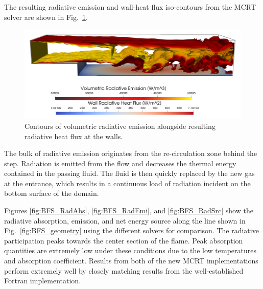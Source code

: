The resulting radiative emission and wall-heat flux iso-contours from the MCRT solver are shown in Fig.~\ref{fig:BFS_radiationcontours}.
\begin{figure}
\includegraphics[width=\linewidth]{figures/ch4/BFS_volwallflux3.png}
\caption{Contours of volumetric radiative emission alongside resulting radiative heat flux at the walls.}
\label{fig:BFS_radiationcontours}
\end{figure}
The bulk of radiative emission originates from the re-circulation zone behind the step. Radiation is emitted from the flow and decreases the thermal energy contained in the passing fluid. 
The fluid is then quickly replaced by the new gas at the entrance, which results in a continuous load of radiation incident on the bottom surface of the domain. 

Figures \ref{fig:BFS_RadAbs}, \ref{fig:BFS_RadEmi}, and \ref{fig:BFS_RadSrc} show the radiative absorption, emission, and net energy source along the line shown in Fig.~\ref{fig:BFS_geometry} using the different solvers for comparison. 
The radiative participation peaks towards the center section of the flame. Peak absorption quantities are extremely low under these conditions due to the low temperatures and absorption coefficient. Results from both of the new MCRT implementations perform extremely well by closely matching results from the well-established Fortran implementation.


